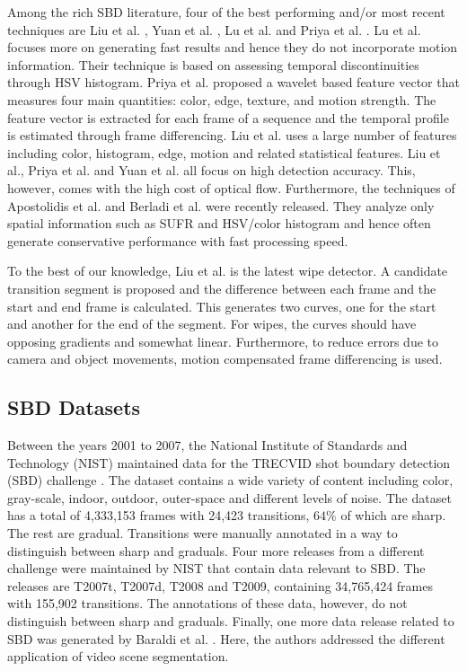 \documentclass[journal]{IEEEtran}
\begin{document}
Among the rich SBD literature, four of the best performing and/or most recent techniques are Liu et al. \cite{Liu07}, Yuan et al. \cite{Yuan05}, Lu et al. \cite{Lu13} and Priya et al. \cite{Priya14}. Lu et al. focuses more on generating fast results and hence they do not incorporate motion information. Their technique is based on assessing temporal discontinuities through HSV histogram. 
Priya et al. \cite{Priya14} proposed a wavelet based feature vector that measures four main quantities: color, edge, texture, and motion strength. 
The feature vector is extracted for each frame of a sequence and the temporal profile is estimated through frame differencing. Liu et al. \cite{Liu07} uses a large number of features including color, histogram, edge, motion and related statistical features. Liu et al., Priya et al. and Yuan et al. all focus on high detection accuracy. This, however, comes with the high cost of optical flow. Furthermore, the techniques of Apostolidis et al. \cite{Apostolidis14} and Berladi et al. \cite{Berladi15} were recently released. They analyze only spatial information such as SUFR and HSV/color histogram and hence often generate conservative performance with fast processing speed.  


To the best of our knowledge, Liu et al. \cite{Liu07} is the latest wipe detector. A candidate transition segment is proposed and the difference between each frame and the start and end frame is calculated. This generates two curves, one for the start and another for the end of the segment. For wipes, the curves should have opposing gradients and somewhat linear. Furthermore, to reduce errors due to camera and object movements, motion compensated frame differencing is used. 








\subsection{SBD Datasets}

Between the years 2001 to 2007, the National Institute of Standards and Technology (NIST) \cite{NIST} maintained data for the TRECVID shot boundary detection (SBD) challenge \cite{Smeaton10}. The dataset contains a wide variety of content including color, gray-scale, indoor, outdoor, outer-space and different levels of noise. The dataset has a total of 4,333,153 frames with 24,423 transitions, $64\%$ of which are sharp. The rest are gradual. Transitions were manually annotated in a way to distinguish between sharp and graduals. 
Four more releases from a different challenge were maintained by NIST that contain data relevant to SBD. The releases are T2007t, T2007d, T2008 and T2009, containing 34,765,424 frames with 155,902 transitions. The annotations of these data, however, do not distinguish between sharp and graduals. 
Finally, one more data release related to SBD was generated by Baraldi et al. \cite{Baraldi15}. Here, the authors addressed the different application of video scene segmentation.
\end{document}
